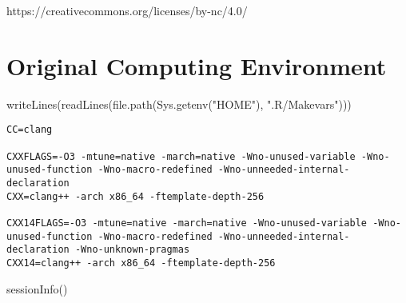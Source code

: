 \documentclass[
  letterpaper,
  DIV=11,
  numbers=noendperiod]{scrartcl}
\newenvironment{Shaded}{\begin{snugshade}}{\end{snugshade}}
\newcommand{\FunctionTok}[1]{\textcolor[rgb]{0.28,0.35,0.67}{#1}}
\newcommand{\NormalTok}[1]{\textcolor[rgb]{0.00,0.23,0.31}{#1}}
\newcommand{\StringTok}[1]{\textcolor[rgb]{0.13,0.47,0.30}{#1}}
\begin{document}
https://creativecommons.org/licenses/by-nc/4.0/

\section*{Original Computing
Environment}\label{original-computing-environment}

\begin{Shaded}
\begin{Highlighting}[]
\FunctionTok{writeLines}\NormalTok{(}\FunctionTok{readLines}\NormalTok{(}\FunctionTok{file.path}\NormalTok{(}\FunctionTok{Sys.getenv}\NormalTok{(}\StringTok{"HOME"}\NormalTok{), }\StringTok{".R/Makevars"}\NormalTok{)))}
\end{Highlighting}
\end{Shaded}

\begin{verbatim}
CC=clang

CXXFLAGS=-O3 -mtune=native -march=native -Wno-unused-variable -Wno-unused-function -Wno-macro-redefined -Wno-unneeded-internal-declaration
CXX=clang++ -arch x86_64 -ftemplate-depth-256

CXX14FLAGS=-O3 -mtune=native -march=native -Wno-unused-variable -Wno-unused-function -Wno-macro-redefined -Wno-unneeded-internal-declaration -Wno-unknown-pragmas
CXX14=clang++ -arch x86_64 -ftemplate-depth-256
\end{verbatim}

\begin{Shaded}
\begin{Highlighting}[]
\FunctionTok{sessionInfo}\NormalTok{()}
\end{Highlighting}
\end{Shaded}
\end{document}
